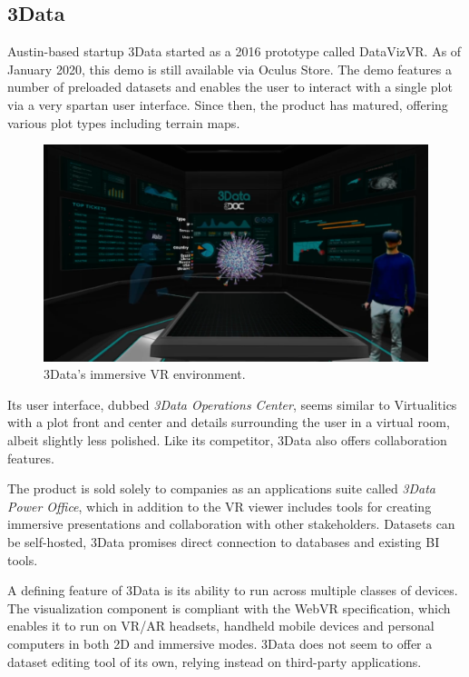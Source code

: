 \documentclass[thesis=M,english,hidelinks]{FITthesisXE}[2012/06/26]
\begin{document}
\subsection{3Data}

Austin-based startup 3Data started as a 2016 prototype called DataVizVR.\autocite{datavizvroculus} As of January 2020, this demo is still available via Oculus Store. The demo features a number of preloaded datasets and enables the user to interact with a single plot via a very spartan user interface. Since then, the product has matured, offering various plot types including terrain maps.\autocite{3data}

\begin{figure}[ht]
\centering
\includegraphics[scale=0.2]{3data}
\caption{3Data's immersive VR environment.\autocite{3datavideo}}
\label{fig:3data}
\end{figure}

Its user interface, dubbed \emph{3Data Operations Center}, seems similar to Virtualitics with a plot front and center and details surrounding the user in a virtual room, albeit slightly less polished. Like its competitor, 3Data also offers collaboration features.

\newpage

The product is sold solely to companies as an applications suite called \emph{3Data Power Office}, which in addition to the VR viewer includes tools for creating immersive presentations and collaboration with other stakeholders. Datasets can be self-hosted, 3Data promises direct connection to databases and existing BI tools.\autocite{3datasuite}

A defining feature of 3Data is its ability to run across multiple classes of devices. The visualization component is compliant with the WebVR specification, which enables it to run on VR/AR headsets, handheld mobile devices and personal computers in both 2D and immersive modes.\autocite{webvr} 3Data does not seem to offer a dataset editing tool of its own, relying instead on third-party applications.
\end{document}
